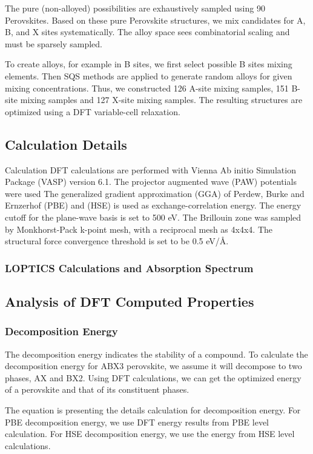 \documentclass[twoside, twocolumn, 9pt, draft]{article}
\begin{document}
The pure (non-alloyed) possibilities are exhaustively sampled using 90
Perovskites. Based on these pure Perovskite structures, we mix
candidates for A, B, and X sites systematically. The alloy space sees
combinatorial scaling and must be sparsely sampled.

To create alloys, for example in B sites, we first select possible B
sites mixing elements.  Then SQS methods are applied to generate
random alloys for given mixing concentrations. Thus, we constructed
126 A-site mixing samples, 151 B-site mixing samples and 127 X-site
mixing samples. The resulting structures are optimized using a DFT
variable-cell relaxation.

\subsection*{Calculation Details}
\label{sec:orge4c5f92}
Calculation DFT calculations are performed with Vienna Ab initio
Simulation Package (VASP) version 6.1. The projector augmented wave
(PAW) potentials were used The generalized gradient approximation (GGA)
of Perdew, Burke and Ernzerhof (PBE) and (HSE) is used as
exchange-correlation energy. The energy cutoff for the plane-wave basis
is set to 500 eV. The Brillouin zone was sampled by Monkhorst-Pack
k-point mesh, with a reciprocal mesh as 4x4x4. The structural force
convergence threshold is set to be 0.5 eV/Å.

\subsubsection*{LOPTICS Calculations and Absorption Spectrum}
\label{sec:orgd4aaec6}

\subsection*{Analysis of DFT Computed Properties}
\label{sec:org991eca5}
\subsubsection*{Decomposition Energy}
\label{sec:orgb198493}
The decomposition energy indicates the stability of a compound. To
calculate the decomposition energy for ABX3 perovskite, we assume it
will decompose to two phases, AX and BX2. Using DFT calculations, we
can get the optimized energy of a perovskite and that of its
constituent phases.

The equation is presenting the details calculation for decomposition
energy. For PBE decomposition energy, we use DFT energy results from
PBE level calculation. For HSE decomposition energy, we use the energy
from HSE level calculations.
\end{document}
